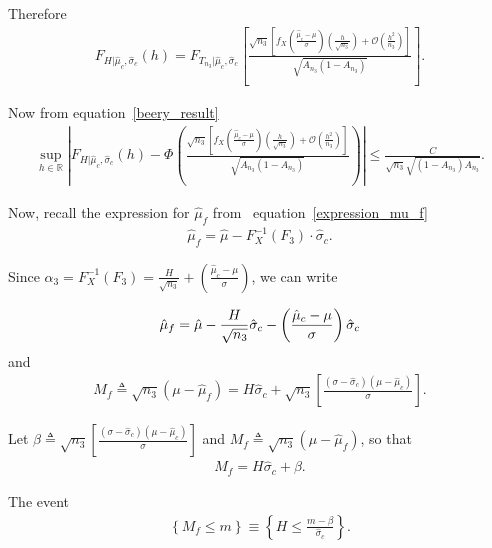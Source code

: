 \documentclass[10pt]{article} %
\def\eqref#1{equation~\ref{#1}}
\theoremstyle{plain}
\theoremstyle{definition}
\theoremstyle{remark}
\begin{document}
Therefore
\begin{align*}
  F_{H |\hat{\mu}_c, \hat{\sigma}_c}(h) =  F_{T_{n_3}| \hat{\mu}_c, \hat{\sigma}_c}    \left [  \frac{\sqrt{n_3}  \left[ f_{X} \left( \frac{\hat{\mu}_c - \mu}{\sigma} \right)\left( \frac{h}{\sqrt{n_3}} \right) + \mathcal{O} \left(\frac{h^2}{n_3}\right) \right ]   }{\sqrt{A_{n_3}(1-A_{n_3})}}    \right].
\end{align*}

Now from \eqref{beery_result}
\begin{align}
 \sup_{h \in \mathbb{R}}  \left|  F_{H |\hat{\mu}_c, \hat{\sigma}_c}(h) - \Phi\left(  \frac{\sqrt{n_3}  \left[ f_{X} \left( \frac{\hat{\mu}_c - \mu}{\sigma} \right) \left( \frac{h}{\sqrt{n_3}} \right) + \mathcal{O} \left(\frac{h^2}{n_3}\right) \right ]   }{\sqrt{A_{n_3}(1-A_{n_3})}}\right) \right |   \leq \frac{C}{\sqrt{n_3} \sqrt{(1 - A_{n_3})A_{n_3}}}. \label{H_cdf}
\end{align}

 Now, recall the expression for  \( \hat{\mu}_f\) from  ~\eqref{expression_mu_f}
\begin{align*}
\hat{\mu}_f =  \hat{\mu} -  {F^{-1}_X (F_3)} \cdot \hat{\sigma}_c.
\end{align*}

Since \( \alpha_3 = {F^{-1}_X (F_3)}  = \frac{H}{\sqrt{n_3}} +  \left( \frac{\hat{\mu}_c - \mu}{\sigma}  \right)  \), we can write

\begin{align}
 \hat{\mu}_f  = \hat{\mu} - \frac{H}{\sqrt{n_3}}\hat{\sigma}_c -  \left( \frac{\hat{\mu}_c - \mu}{\sigma}  \right)  \hat{\sigma}_c \notag
 \end{align}
 and
 \begin{align}
M_f\triangleq \sqrt{n_3} ( \mu - \hat{\mu}_f  ) = H \hat{\sigma}_c + \sqrt{n_3} \left[  \frac{\left(  \sigma - \hat{\sigma}_c \right) \left(  \mu - \hat{\mu}_c \right) }{\sigma} \right]. \label{termmu_f}
\end{align}


Let    \( \beta \triangleq \sqrt{n_3} \left[  \frac{\left(  \sigma - \hat{\sigma}_c \right) \left(  \mu - \hat{\mu}_c \right) }{\sigma} \right] \) and \(M_f \triangleq  \sqrt{n_3} ( \mu - \hat{\mu}_f  ) \), so that
\begin{align*}
    M_f = H \hat{\sigma}_c + \beta.
\end{align*}

The event
\begin{align}
    \left \{ M_f \leq m \right \}  \equiv \left \{  H \leq \frac{m-\beta}{\hat{\sigma}_c}\right \}.
\end{align}
\end{document}
